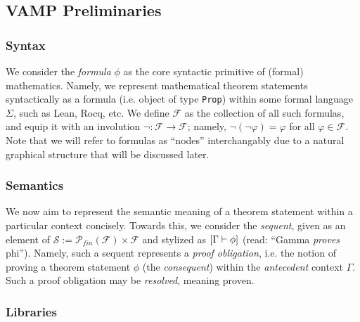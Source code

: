 \subsection{VAMP Preliminaries}


\subsubsection{Syntax}

We consider the \textit{formula} $\phi$ as the core syntactic primitive of (formal) mathematics. Namely, we represent mathematical theorem statements syntactically as a formula (i.e. object of type \texttt{Prop}) within some formal language $\Sigma$, such as Lean, Rocq, etc. We define $\mathcal{F}$ as the collection of all such formulas, and equip it with an involution $\lnot : \mathcal{F}\rightarrow \mathcal{F}$; namely, $\lnot(\lnot\varphi)=\varphi$ for all $\varphi\in\mathcal{F}$. Note that we will refer to formulas as ``nodes'' interchangably due to a natural graphical structure that will be discussed later.

\subsubsection{Semantics}

We now aim to represent the semantic meaning of a theorem statement within a particular context concisely. Towards this, we consider the \textit{sequent}, given as an element of $\mathcal{S} := \mathcal{P}_{fin}(\mathcal{F}) \times \mathcal{F} $ and stylized as $[\Gamma \vdash \phi]$ (read: ``Gamma \textit{proves} phi''). Namely, such a sequent represents a \textit{proof obligation}, i.e. the notion of proving a theorem statement $\phi$ (the \textit{consequent}) within the \textit{antecedent} context $\Gamma$. Such a proof obligation may be \textit{resolved}, meaning proven.

\subsubsection{Libraries}

